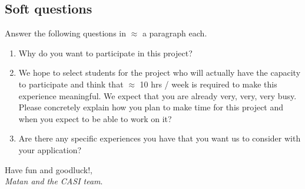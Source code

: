 \documentclass[11pt]{article}
\begin{document}
\subsection{Soft questions}
Answer the following questions in $\approx$ a paragraph each.
\begin{enumerate}
    \item Why do you want to participate in this project? 
    \item We hope to select students for the project who will actually have the capacity to participate and think that $\approx$ 10 hrs / week is required to make this experience meaningful. We expect that you are already very, very, very busy. Please concretely explain how you plan to make time for this project and when you expect to be able to work on it? 
    \item Are there any specific experiences you have that you want us to consider with your application?  
\end{enumerate}




\begin{center}
Have fun and goodluck!, \\
\emph{Matan and the CASI team}.
\end{center}

\printbibliography
\end{document}
